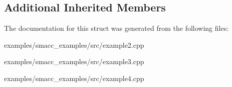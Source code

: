 \subsection*{Additional Inherited Members}


The documentation for this struct was generated from the following files\-:\begin{DoxyCompactItemize}
\item 
examples/smacc\-\_\-examples/src/example2.\-cpp\item 
examples/smacc\-\_\-examples/src/example3.\-cpp\item 
examples/smacc\-\_\-examples/src/example4.\-cpp\end{DoxyCompactItemize}
